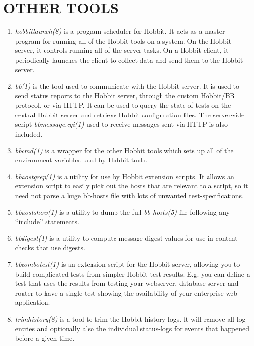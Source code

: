 \section{OTHER TOOLS}

\begin{enumerate}

\item \emph{hobbitlaunch(8)}
 is a program scheduler for Hobbit. It acts as a master program for
 running all of the Hobbit tools on a system. On the Hobbit server, it
 controls running all of the server tasks. On a Hobbit client, it
 periodically launches the client to collect data and send them to the
 Hobbit server. 


\item  \emph{bb(1)}
 is the tool used to communicate with the Hobbit server. It is used to
 send status reports to the Hobbit server, through the custom
 Hobbit/BB protocol, or via HTTP. It can be used to query the state of
 tests on the central Hobbit server and retrieve Hobbit configuration
 files. The server-side script \emph{bbmessage.cgi(1) } used to
 receive messages sent via HTTP is also included. 


\item  \emph{bbcmd(1)}
 is a wrapper for the other Hobbit tools which sets up all of the
 environment variables used by Hobbit tools. 



\item  \emph{bbhostgrep(1)}
 is a utility for use by Hobbit extension scripts. It allows an
 extension script to easily pick out the hosts that are relevant to a
 script, so it need not parse a huge bb-hosts file with lots of
 unwanted test-specifications. 



\item  \emph{bbhostshow(1)}
 is a utility to dump the full \emph{bb-hosts(5)}
 file following any ``include'' statements. 


\item  \emph{bbdigest(1)}
 is a utility to compute message digest values for use in content checks that use digests. 


\item  \emph{bbcombotest(1)}
 is an extension script for the Hobbit server, allowing you to build
 complicated tests from simpler Hobbit test results. E.g. you can
 define a test that uses the results from testing your webserver,
 database server and router to have a single test showing the
 availability of your enterprise web application. 



\item  \emph{trimhistory(8)}
 is a tool to trim the Hobbit history logs. It will remove all log
 entries and optionally also the individual status-logs for events
 that happened before a given time. 

\end{enumerate}

